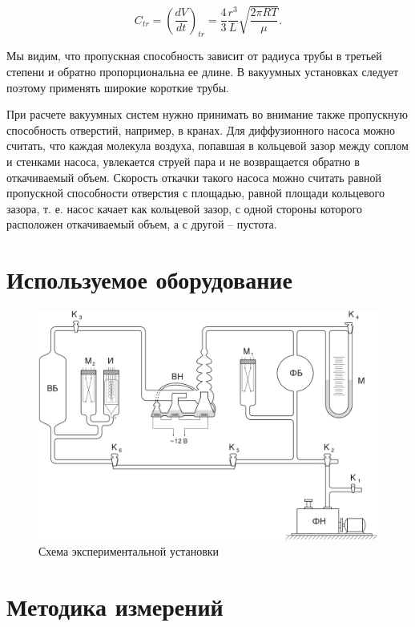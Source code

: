 \documentclass[a4paper,12pt]{article} %
\begin{document}
\begin{equation}
	C_{tr}=(\frac{dV}{dt})_{tr}=\frac{4}{3}\frac{r^3}{L}\sqrt{\frac{2\pi RT}{\mu}}.
\end{equation}

Мы видим, что пропускная способность зависит от радиуса трубы в третьей степени и обратно пропорциональна ее длине. В вакуумных установках следует поэтому применять широкие короткие  трубы.

При расчете вакуумных систем нужно принимать во внимание также пропускную способность отверстий, например, в кранах. Для диффузионного насоса можно считать, что каждая молекула воздуха, попавшая в кольцевой зазор между соплом и стенками насоса, увлекается струей пара и не возвращается обратно в откачиваемый объем. Скорость откачки такого насоса можно считать равной пропускной способности отверстия с площадью, равной площади кольцевого зазора, т. е. насос качает как кольцевой зазор, с одной стороны которого расположен откачиваемый объем, а с другой -- пустота.

\newpage

\section{Используемое оборудование}

\begin{figure}[h!]
    \centering
    \includegraphics[width=\textwidth]{установка.png}
    \caption{Схема экспериментальной установки}\label{setup}
\end{figure}

\FloatBarrier

\section{Методика измерений}
\end{document}

